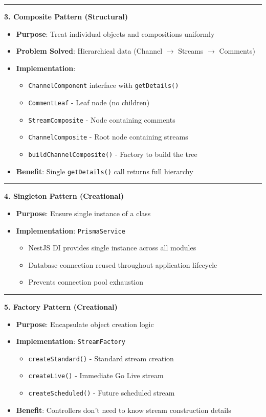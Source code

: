 \documentclass[10pt]{article}
\begin{document}
\begin{tcolorbox}[
  colback=white,
  colframe=dark,
  arc=3pt,
  boxrule=1pt,
  before skip=8pt,
  after skip=8pt
]
\hrule

\textbf{3. Composite Pattern (Structural)}
\begin{itemize}
\item \textbf{Purpose}: Treat individual objects and compositions uniformly
\item \textbf{Problem Solved}: Hierarchical data (Channel $\rightarrow$ Streams $\rightarrow$ Comments)
\item \textbf{Implementation}:
\begin{itemize}
\item \texttt{ChannelComponent} interface with \texttt{getDetails()}
\item \texttt{CommentLeaf} - Leaf node (no children)
\item \texttt{StreamComposite} - Node containing comments
\item \texttt{ChannelComposite} - Root node containing streams
\item \texttt{buildChannelComposite()} - Factory to build the tree
\end{itemize}
\item \textbf{Benefit}: Single \texttt{getDetails()} call returns full hierarchy
\end{itemize}

\hrule

\textbf{4. Singleton Pattern (Creational)}
\begin{itemize}
\item \textbf{Purpose}: Ensure single instance of a class
\item \textbf{Implementation}: \texttt{PrismaService}
\begin{itemize}
\item NestJS DI provides single instance across all modules
\item Database connection reused throughout application lifecycle
\item Prevents connection pool exhaustion
\end{itemize}
\end{itemize}

\hrule

\textbf{5. Factory Pattern (Creational)}
\begin{itemize}
\item \textbf{Purpose}: Encapsulate object creation logic
\item \textbf{Implementation}: \texttt{StreamFactory}
\begin{itemize}
\item \texttt{createStandard()} - Standard stream creation
\item \texttt{createLive()} - Immediate Go Live stream
\item \texttt{createScheduled()} - Future scheduled stream
\end{itemize}
\item \textbf{Benefit}: Controllers don't need to know stream construction details
\end{itemize}


\end{tcolorbox}
\end{document}
